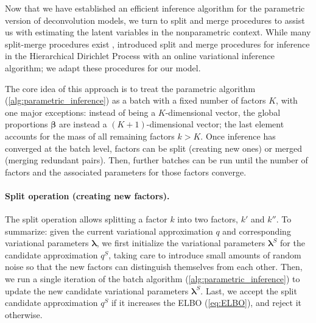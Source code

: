\documentclass[twoside,11pt]{article}
\begin{document}
Now that we have established an efficient inference algorithm for the parametric version of deconvolution models, we turn to split and merge procedures to assist us with estimating the latent variables in the nonparametric context. While many split-merge procedures exist \citep{ueda1999smem, jain2004split, dahl2005sequentially, wang2012split}, \citet{bryant2012truly} introduced split and merge procedures for inference in the Hierarchical Dirichlet Process with an online variational inference algorithm; we adapt these procedures for our model.

The core idea of this approach is to treat the parametric algorithm (\cref{alg:parametric_inference}) as a batch with a fixed number of factors $K$, with one major exceptions: instead of being a $K$-dimensional vector, the global proportions $\boldsymbol{\beta}$ are instead a $(K+1)$-dimensional vector; the last element accounts for the mass of all remaining factors $k>K$.  Once inference has converged at the batch level, factors can be split (creating new ones) or merged (merging redundant pairs).  Then, further batches can be run until the number of factors and the associated parameters for those factors converge.

\paragraph{Split operation (creating new factors).}  The split operation allows splitting a factor $k$ into two factors, $k'$ and $k''$.  To summarize: given the current variational approximation $q$ and corresponding variational parameters $\boldsymbol{\lambda}$, we first initialize the variational parameters $\boldsymbol{\lambda}^S$ for the candidate approximation $q^S$, taking care to introduce small amounts of random noise so that the new factors can distinguish themselves from each other.
Then, we run a single iteration of the batch algorithm (\cref{alg:parametric_inference}) to update the new candidate variational parameters $\boldsymbol{\lambda}^S$.  Last, we accept the split candidate approximation $q^S$ if it increases the ELBO (\cref{eq:ELBO}), and reject it otherwise.
\end{document}

